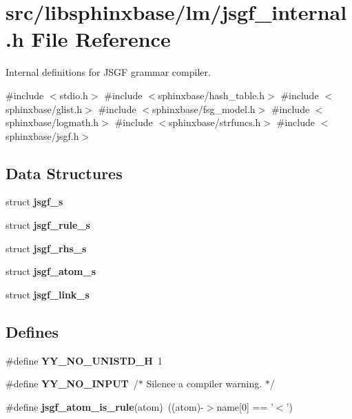 \section{src/libsphinxbase/lm/jsgf\-\_\-internal.h \-File \-Reference}
\label{jsgf__internal_8h}


\-Internal definitions for \-J\-S\-G\-F grammar compiler.  


{\ttfamily \#include $<$stdio.\-h$>$}\*
{\ttfamily \#include $<$sphinxbase/hash\-\_\-table.\-h$>$}\*
{\ttfamily \#include $<$sphinxbase/glist.\-h$>$}\*
{\ttfamily \#include $<$sphinxbase/fsg\-\_\-model.\-h$>$}\*
{\ttfamily \#include $<$sphinxbase/logmath.\-h$>$}\*
{\ttfamily \#include $<$sphinxbase/strfuncs.\-h$>$}\*
{\ttfamily \#include $<$sphinxbase/jsgf.\-h$>$}\*
\subsection*{\-Data \-Structures}
\begin{DoxyCompactItemize}
\item 
struct {\bf jsgf\-\_\-s}
\item 
struct {\bf jsgf\-\_\-rule\-\_\-s}
\item 
struct {\bf jsgf\-\_\-rhs\-\_\-s}
\item 
struct {\bf jsgf\-\_\-atom\-\_\-s}
\item 
struct {\bf jsgf\-\_\-link\-\_\-s}
\end{DoxyCompactItemize}
\subsection*{\-Defines}
\begin{DoxyCompactItemize}
\item 
\#define {\bfseries \-Y\-Y\-\_\-\-N\-O\-\_\-\-U\-N\-I\-S\-T\-D\-\_\-\-H}~1\label{jsgf__internal_8h_ae78ac56cd1f29572e967ed7636952d15}

\item 
\#define {\bfseries \-Y\-Y\-\_\-\-N\-O\-\_\-\-I\-N\-P\-U\-T}~/$\ast$ \-Silence a compiler warning. $\ast$/\label{jsgf__internal_8h_a85523a0c7d95c059d251b4e9829947aa}

\item 
\#define {\bfseries jsgf\-\_\-atom\-\_\-is\-\_\-rule}(atom)~((atom)-\/$>$name[0] == '$<$')\label{jsgf__internal_8h_ac4452bbb59863e64d73f4fe2d6cd394f}

\end{DoxyCompactItemize}
